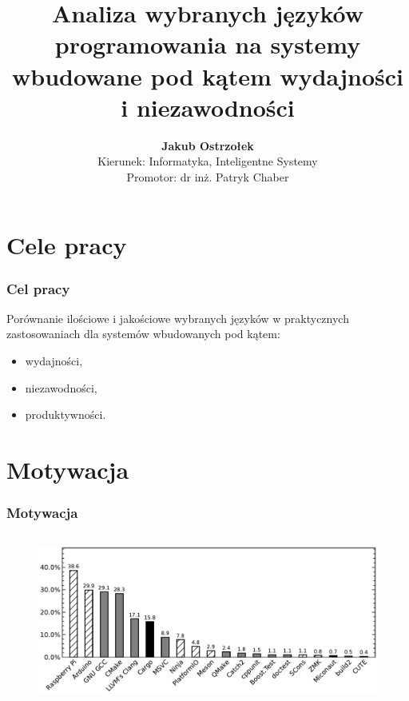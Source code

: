 \documentclass{beamer}
\title[Analiza języków dla systemów wbudowanych \insertframenumber/\inserttotalframenumber]{
	 Analiza wybranych języków programowania na systemy wbudowane pod
	 kątem wydajności i niezawodności
}
\author[Jakub Ostrzołek]{
 	\textbf{Jakub Ostrzołek} \\ \vspace{\smallskipamount}
	\scriptsize Kierunek: Informatyka, Inteligentne Systemy \\ \vspace{\bigskipamount}
  \footnotesize Promotor: dr inż. Patryk Chaber
}
\institute{
	Instytut Automatyki i Informatyki Stosowanej \\%
  Politechnika Warszawska
}
\begin{document}
\frame{\titlepage}


\section{Cele pracy}

\begin{frame}
	\frametitle{Cel pracy}
	Porównanie ilościowe i jakościowe wybranych języków w praktycznych
	zastosowaniach dla systemów wbudowanych pod kątem:

	\begin{itemize}
		\item wydajności,
		\item niezawodności,
		\item produktywności.
	\end{itemize}
\end{frame}

\section{Motywacja}

\begin{frame}
	\frametitle{Motywacja}

	\begin{columns}
		\column{\dimexpr\paperwidth-10pt}
		\begin{figure}
			\includegraphics[width=\linewidth]{img/plots/so-survey.pdf}
			\centering
			\caption{ \cite{so-survey}}
		\end{figure}
	\end{columns}
\end{frame}
\end{document}
